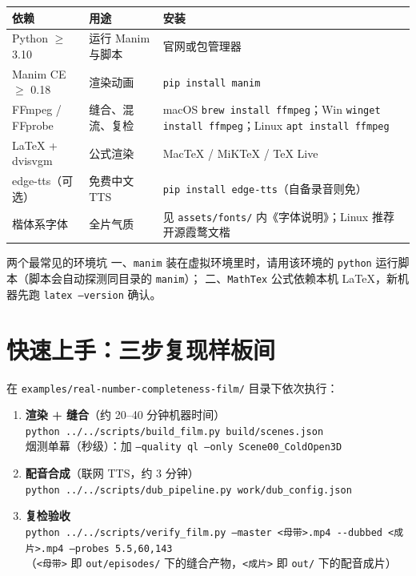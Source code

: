 \documentclass[12pt,a4paper]{ctexart}
\newcommand{\code}[1]{\texttt{\small #1}}
\begin{document}
\begin{center}
\begin{tabular}{p{3.4cm} p{4.6cm} p{6.4cm}}
\hline
\rowcolor{ptbg} 依赖 & 用途 & 安装 \\
\hline
Python $\geq$ 3.10 & 运行 Manim 与脚本 & 官网或包管理器 \\
Manim CE $\geq$ 0.18 & 渲染动画 & \code{pip install manim} \\
FFmpeg / FFprobe & 缝合、混流、复检 & macOS \code{brew install ffmpeg}；Win \code{winget install ffmpeg}；Linux \code{apt install ffmpeg} \\
LaTeX + dvisvgm & 公式渲染 & MacTeX / MiKTeX / TeX Live \\
edge-tts（可选） & 免费中文 TTS & \code{pip install edge-tts}（自备录音则免） \\
楷体系字体 & 全片气质 & 见 \code{assets/fonts/} 内《字体说明》；Linux 推荐开源霞鹜文楷 \\
\hline
\end{tabular}
\end{center}

\begin{warnbox}{两个最常见的环境坑}
一、\code{manim} 装在虚拟环境里时，请用该环境的 \code{python} 运行脚本（脚本会自动探测同目录的 \code{manim}）；
二、\code{MathTex} 公式依赖本机 LaTeX，新机器先跑 \code{latex --version} 确认。
\end{warnbox}

\section{快速上手：三步复现样板间}

在 \code{examples/real-number-completeness-film/} 目录下依次执行：

\begin{enumerate}
    \item \textbf{渲染 + 缝合}（约 20--40 分钟机器时间）\\
    \code{python ../../scripts/build\_film.py build/scenes.json}\\
    烟测单幕（秒级）：加 \code{--quality ql --only Scene00\_ColdOpen3D}
    \item \textbf{配音合成}（联网 TTS，约 3 分钟）\\
    \code{python ../../scripts/dub\_pipeline.py work/dub\_config.json}
    \item \textbf{复检验收}\\
    \code{python ../../scripts/verify\_film.py --master <母带>.mp4 -{}-dubbed <成片>.mp4 --probes 5.5,60,143}\\
    （\code{<母带>} 即 \code{out/episodes/} 下的缝合产物，\code{<成片>} 即 \code{out/} 下的配音成片）
\end{enumerate}
\end{document}
